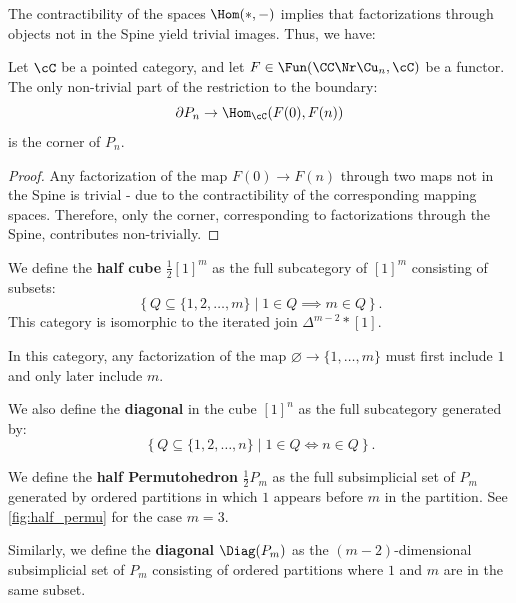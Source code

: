 The contractibility of the spaces $\Hom(*, -)$ implies that factorizations through objects not in the Spine yield trivial images. Thus, we have:

\begin{cor}\label{cor:triv_part_permu}
Let $\cC$ be a pointed category, and let $F \in \Fun(\CC \Nr \Cu_n, \cC)$ be a functor. The only non-trivial part of the restriction to the boundary:
\begin{equation*}
    \partial P_n \to \Hom_{\cC}(F(0), F(n))
\end{equation*}
is the corner of $P_n$.
\end{cor}

\begin{proof}
Any factorization of the map $F(0) \to F(n)$ through two maps not in the Spine is trivial - due to the contractibility of the corresponding mapping spaces. Therefore, only the corner, corresponding to factorizations through the Spine, contributes non-trivially.
\end{proof}

\begin{defn}
We define the \textbf{half cube} $\tfrac{1}{2}[1]^m$ as the full subcategory of $[1]^m$ consisting of subsets:
\begin{equation*}
    \left\{ Q \subseteq \{1, 2, \dots, m\} \mid 1 \in Q \implies m \in Q \right\}.
\end{equation*}
This category is isomorphic to the iterated join $\Delta^{m - 2} \ast [1]$.
\end{defn}

In this category, any factorization of the map $\varnothing \to \{1, \dots, m\}$ must first include $1$ and only later include $m$.

We also define the \textbf{diagonal} in the cube $[1]^n$ as the full subcategory generated by:
\begin{equation*}
    \left\{ Q \subseteq \{1, 2, \dots, n\} \mid 1 \in Q \iff n \in Q \right\}.
\end{equation*}

\begin{defn}
We define the \textbf{half Permutohedron} $\tfrac{1}{2}P_m$ as the full subsimplicial set of $P_m$ generated by ordered partitions in which $1$ appears before $m$ in the partition. See \cref{fig:half_permu} for the case $m = 3$.

Similarly, we define the \textbf{diagonal} $\Diag(P_m)$ as the $(m - 2)$-dimensional subsimplicial set of $P_m$ consisting of ordered partitions where $1$ and $m$ are in the same subset.
\end{defn}

